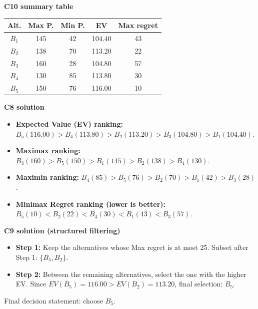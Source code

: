 \begin{ExamProblems}
		\textbf{C10 summary table}
		\begin{center}
			\begin{tabular}{c c c c c}
				\toprule
				Alt. & Max P. & Min P. & EV & Max regret \\
				\midrule
				$B_1$ & 145 & 42 & 104.40 & 43 \\
				$B_2$ & 138 & 70 & 113.20 & 22 \\
				$B_3$ & 160 & 28 & 104.80 & 57 \\
				$B_4$ & 130 & 85 & 113.80 & 30 \\
				$B_5$ & 150 & 76 & 116.00 & 10 \\
				\bottomrule
			\end{tabular}
		\end{center}

		\textbf{C8 solution}
		\begin{itemize}
			\item \textbf{Expected Value (EV) ranking:} $B_5(116.00)>B_4(113.80)>B_2(113.20)>B_3(104.80)>B_1(104.40)$.
			\item \textbf{Maximax ranking:} $B_3(160)>B_5(150)>B_1(145)>B_2(138)>B_4(130)$.
			\item \textbf{Maximin ranking:} $B_4(85)>B_5(76)>B_2(70)>B_1(42)>B_3(28)$.
			\item \textbf{Minimax Regret ranking (lower is better):} $B_5(10)<B_2(22)<B_4(30)<B_1(43)<B_3(57)$.
		\end{itemize}

		\textbf{C9 solution (structured filtering)}
		\begin{itemize}
			\item \textbf{Step 1:} Keep the alternatives whose Max regret is at most 25. Subset after Step 1: $\{B_5,B_2\}$.
			\item \textbf{Step 2:} Between the remaining alternatives, select the one with the higher EV. Since $EV(B_5)=116.00>EV(B_2)=113.20$, final selection: $B_5$.
		\end{itemize}
		Final decision statement: choose $B_5$.

		\newpage
		\item

\end{ExamProblems}
